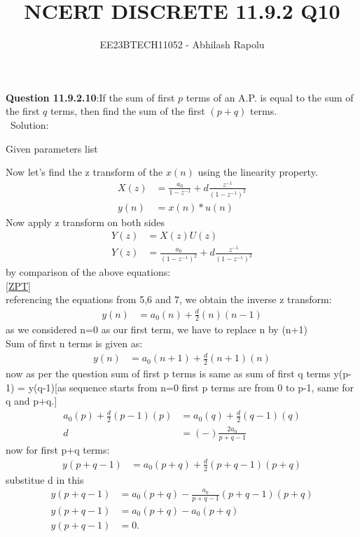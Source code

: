 \documentclass[journal,12pt,twocolumn]{IEEEtran}
\title{NCERT DISCRETE 11.9.2 Q10}
\author{EE23BTECH11052 - Abhilash Rapolu }
\begin{document}
\maketitle
\newpage
\textbf{Question 11.9.2.10}:If the sum of first $p$ terms of an A.P. is equal to the sum of the first $q$ terms, then
find the sum of the first $(p + q)$ terms.\\
\ Solution:
\begin{table}[htbp]
\centering

\caption{Given parameters list}
\end{table}
Now let's find the z transform of the $x(n)$ using the linearity property.\\
\begin{align}
X(z)&=\frac{a_0}{1-z^{-1}}+d\frac{z^{-1}}{(1-z^{-1})^2}\\
y(n) &= x(n)*u(n)
\end{align}
Now apply z transform on both sides\\
\begin{align}
Y(z)&=X(z)U(z)\\
Y(z)&=\frac{a_0}{(1-z^{-1})^2}+d\frac{z^{-1}}{(1-z^{-1})^3}
\end{align}
by comparison of the above equations:\\
\eqref{ZPT}\\
referencing the equations from 5,6 and 7, we obtain the inverse z transform:\\
\begin{align}
y(n)&=a_0(n)+\frac{d}{2}(n)(n-1)
\end{align}
as we considered n=0 as our first term, we have to replace n by (n+1)\\
Sum of first n terms is given as:\\
\begin{align}
y(n)&=a_0(n+1)+\frac{d}{2}(n+1)(n)
\end{align}
now as per the question sum of first p terms is same as sum of first q terms y(p-1) = y(q-1)[as sequence starts from n=0 first p terms are from 0 to p-1, same for q and p+q.]\\
\begin{align}
a_0(p)+\frac{d}{2}(p-1)(p)&=a_0(q)+\frac{d}{2}(q-1)(q)\\
d&=(-)\frac{2a_0}{p+q-1}
\end{align}
now for first p+q terms:\\
\begin{align}
y(p+q-1)&=a_0(p+q)+\frac{d}{2}(p+q-1)(p+q)
\end{align}
substitue d in this\\
\begin{align}
y(p+q-1)&=a_0(p+q)-\frac{a_0}{p+q-1}(p+q-1)(p+q)\\
y(p+q-1)&=a_0(p+q)-a_0(p+q)\\
y(p+q-1)&=0.
\end{align}
\end{document}
